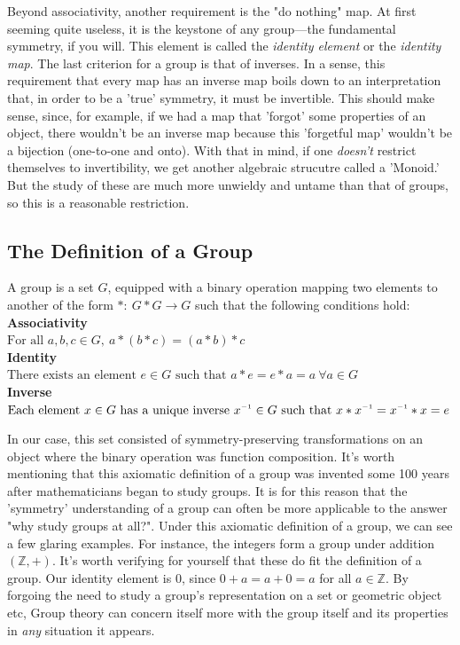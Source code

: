 \documentclass[11pt,a4paper]{article}
\newcommand{\inv}{^{\raisebox{.2ex}{$\scriptscriptstyle-1$}}}
\begin{document}
Beyond associativity, another requirement is the "do nothing" map. At first seeming quite useless, it is the keystone of any group—the fundamental symmetry, if you will. This element is called the \textit{identity element} or the \textit{identity map}. The last criterion for a group is that of inverses. In a sense, this requirement that every map has an inverse map boils down to an interpretation that, in order to be a 'true' symmetry, it must be invertible. This should make sense, since, for example, if we had a map that 'forgot' some properties of an object, there wouldn't be an inverse map because this 'forgetful map' wouldn't be a bijection (one-to-one and onto). With that in mind, if one \textit{doesn't} restrict themselves to invertibility, we get another algebraic strucutre called a 'Monoid.' But the study of these are much more unwieldy and untame than that of groups, so this is a reasonable restriction.

\subsection*{The Definition of a Group}
  A group is a set $G$, equipped with a binary operation mapping two elements to another of the form $\ast:\ G \ast G \to G$ such that the following conditions hold:\autocite[16]{saracino}
\\\textbf{Associativity}
\\$\text{For all } a,b,c \in G,\ a\ast(b \ast c) = (a\ast b) \ast c$
\\\textbf{Identity}
\\$\text{There exists an element } e \in G \text{ such that } a \ast e = e \ast a = a \ \forall a \in G$
\\\textbf{Inverse}
\\$\text{Each element } x \in G \text{ has a unique inverse } x\inv \in G \text{ such that } x \ast x\inv = x\inv \ast x = e$


In our case, this set consisted of symmetry-preserving transformations on an object where the binary operation was function composition. It's worth mentioning that this axiomatic definition of a group was invented some 100 years after mathematicians began to study groups. It is for this reason that the 'symmetry' understanding of a group can often be more applicable to the answer "why study groups at all?". Under this axiomatic definition of a group, we can see a few glaring examples. For instance, the integers form a group under addition $(\mathbb{Z}, +)$. It's worth verifying for yourself that these do fit the definition of a group. Our identity element is 0, since $0 + a = a + 0 = a$ for all $a \in \mathbb{Z}$.
By forgoing the need to study a group's representation on a set or geometric object etc, Group theory can concern itself more with the group itself and its properties in \textit{any} situation it appears.
\end{document}
